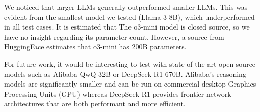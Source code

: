 We noticed that larger LLMs generally outperformed smaller LLMs.  This was evident from the smallest model we tested (Llama 3 8B), which underperformed in all test cases.  It is estimated that The o3-mini model is closed source, so we have no insight regarding its parameter count.  However, a source from HuggingFace\cite{huggingface2025o3mini} estimates that o3-mini has 200B parameters.

For future work, it would be interesting to test with state-of-the art open-source models such as Alibaba QwQ 32B or DeepSeek R1 670B.  Alibaba's reasoning models are significantly smaller and can be run on commercial desktop Graphics Processing Units (GPU) whereas DeepSeek R1 provides frontier network architectures that are both performant and more efficient.